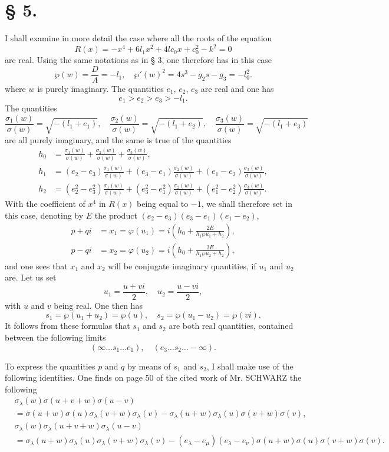 \documentclass{article}
\begin{document}
\section*{§ 5.}
\setcounter{equation}{0}

I shall examine in more detail the case where all the roots of the equation
\[
R(x) = -x^4 + 6l_1x^2 + 4lc_0x + c_0^2 - k^2 = 0
\]
are real.
Using the same notations as in § 3, one therefore has in this case
\[
\wp(w) = \frac{D}{A} = -l_1, \quad \wp'(w)^2 = 4s^3 - g_2s -g_3 = -l_0^2.
\]
where $w$ is purely imaginary.
The quantities $e_1$, $e_2$, $e_3$ are real and one has
\[
e_1 > e_2 > e_3 > -l_1.
\]
The quantities
\[
\frac{\sigma_1(w)}{\sigma(w)} = \sqrt{-(l_1 + e_1)}, \quad \frac{\sigma_2(w)}{\sigma(w)} = \sqrt{-(l_1 + e_2)}, \quad \frac{\sigma_3(w)}{\sigma(w)} = \sqrt{-(l_1 + e_3)}
\]
are all purely imaginary, and the same is true of the quantities
\begin{align*}
h_0 &= \frac{\sigma_1(w)}{\sigma(w)} + \frac{\sigma_2(w)}{\sigma(w)} + \frac{\sigma_3(w)}{\sigma(w)}, \\
h_1 &= (e_2 - e_3)\frac{\sigma_1(w)}{\sigma(w)} + (e_3 - e_1)\frac{\sigma_2(w)}{\sigma(w)} + (e_1 - e_2)\frac{\sigma_3(w)}{\sigma(w)}, \\
h_2 &= (e_2^2 - e_3^2)\frac{\sigma_1(w)}{\sigma(w)} + (e_3^2 - e_1^2)\frac{\sigma_2(w)}{\sigma(w)} + (e_1^2 - e_2^2)\frac{\sigma_3(w)}{\sigma(w)}.
\end{align*}
With the coefficient of $x^4$ in $R(x)$ being equal to $-1$, we shall therefore set in this case, denoting by $E$ the product $(e_2 - e_3)(e_3 - e_1)(e_1 - e_2)$,
\begin{align*}
p + qi &= x_1 = \varphi(u_1) = i\left(h_0 + \frac{2E}{h_1\wp u_1 + h_2}\right), \\
p - qi &= x_2 = \varphi(u_2) = i\left(h_0 + \frac{2E}{h_1\wp u_2 + h_2}\right),
\end{align*}
and one sees that $x_1$ and $x_2$ will be conjugate imaginary quantities, if $u_1$ and $u_2$ are. Let us set
\[
u_1 = \frac{u + vi}{2}, \quad u_2 = \frac{u - vi}{2},
\]
with $u$ and $v$ being real.
One then has
\[
s_1 = \wp(u_1 + u_2) = \wp(u), \quad s_2 = \wp(u_1 - u_2) = \wp(vi).
\]
It follows from these formulas that $s_1$ and $s_2$ are both real quantities, contained between the following limits
\[
(\infty \ldots s_1 \ldots e_1), \quad (e_3 \ldots s_2 \ldots -\infty).
\]

To express the quantities $p$ and $q$ by means of $s_1$ and $s_2$, I shall make use of the following identities.
One finds on page 50 of the cited work of Mr. SCHWARZ the following
\begin{align*}
&\sigma_\lambda(w)\sigma(u + v + w)\sigma(u - v) \\
&= \sigma(u + w)\sigma(u)\sigma_\lambda(v + w)\sigma_\lambda(v) - \sigma_\lambda(u + w)\sigma_\lambda(u)\sigma(v + w)\sigma(v), \\
&\sigma_\lambda(w)\sigma_\lambda(u + v + w)\sigma_\lambda(u - v) \\
&= \sigma_\lambda(u + w)\sigma_\lambda(u)\sigma_\lambda(v + w)\sigma_\lambda(v) - (e_\lambda - e_\mu)(e_\lambda - e_\nu)\sigma(u + w)\sigma(u)\sigma(v + w)\sigma(v).
\end{align*}
\end{document}
